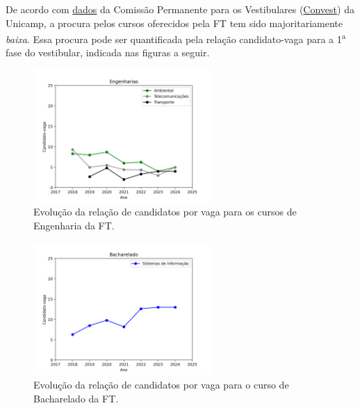 \documentclass[
  letterpaper,
  DIV=11,
  numbers=noendperiod,
  oneside]{scrreprt}
\begin{document}
De acordo com
\href{https://www.comvest.unicamp.br/base-de-dados-comvest/vestibulares/vestibulares-anteriores/}{dados}
da Comissão Permanente para os Vestibulares
(\href{https://www.comvest.unicamp.br/}{Convest}) da Unicamp, a procura
pelos cursos oferecidos pela FT tem sido majoritariamente \emph{baixa}.
Essa procura pode ser quantificada pela relação candidato-vaga para a
1\textsuperscript{a} fase do vestibular, indicada nas figuras a seguir.

\begin{figure}[H]

{\centering \includegraphics[width=0.6\textwidth,height=\textheight]{justificativa/../dados/grafico-candidato-vaga-engenharias.png}

}

\caption{Evolução da relação de candidatos por vaga para os cursos de
Engenharia da FT.}

\end{figure}%

\begin{figure}[H]

{\centering \includegraphics[width=0.6\textwidth,height=\textheight]{justificativa/../dados/grafico-candidato-vaga-bacharelado.png}

}

\caption{Evolução da relação de candidatos por vaga para o curso de
Bacharelado da FT.}

\end{figure}%
\end{document}
